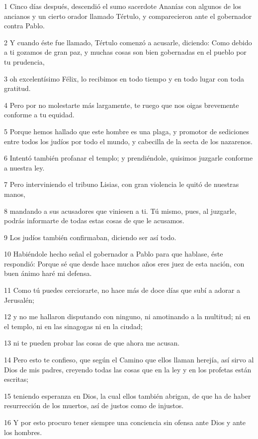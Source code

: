 \par 1 Cinco días después, descendió el sumo sacerdote Ananías con algunos de los ancianos y un cierto orador llamado Tértulo, y comparecieron ante el gobernador contra Pablo.
\par 2 Y cuando éste fue llamado, Tértulo comenzó a acusarle, diciendo: Como debido a ti gozamos de gran paz, y muchas cosas son bien gobernadas en el pueblo por tu prudencia,
\par 3 oh excelentísimo Félix, lo recibimos en todo tiempo y en todo lugar con toda gratitud.
\par 4 Pero por no molestarte más largamente, te ruego que nos oigas brevemente conforme a tu equidad.
\par 5 Porque hemos hallado que este hombre es una plaga, y promotor de sediciones entre todos los judíos por todo el mundo, y cabecilla de la secta de los nazarenos.
\par 6 Intentó también profanar el templo; y prendiéndole, quisimos juzgarle conforme a nuestra ley.
\par 7 Pero interviniendo el tribuno Lisias, con gran violencia le quitó de nuestras manos,
\par 8 mandando a sus acusadores que viniesen a ti. Tú mismo, pues, al juzgarle, podrás informarte de todas estas cosas de que le acusamos.
\par 9 Los judíos también confirmaban, diciendo ser así todo.
\par 10 Habiéndole hecho señal el gobernador a Pablo para que hablase, éste respondió: Porque sé que desde hace muchos años eres juez de esta nación, con buen ánimo haré mi defensa.
\par 11 Como tú puedes cerciorarte, no hace más de doce días que subí a adorar a Jerusalén;
\par 12 y no me hallaron disputando con ninguno, ni amotinando a la multitud; ni en el templo, ni en las sinagogas ni en la ciudad;
\par 13 ni te pueden probar las cosas de que ahora me acusan.
\par 14 Pero esto te confieso, que según el Camino que ellos llaman herejía, así sirvo al Dios de mis padres, creyendo todas las cosas que en la ley y en los profetas están escritas;
\par 15 teniendo esperanza en Dios, la cual ellos también abrigan, de que ha de haber resurrección de los muertos, así de justos como de injustos.
\par 16 Y por esto procuro tener siempre una conciencia sin ofensa ante Dios y ante los hombres.

